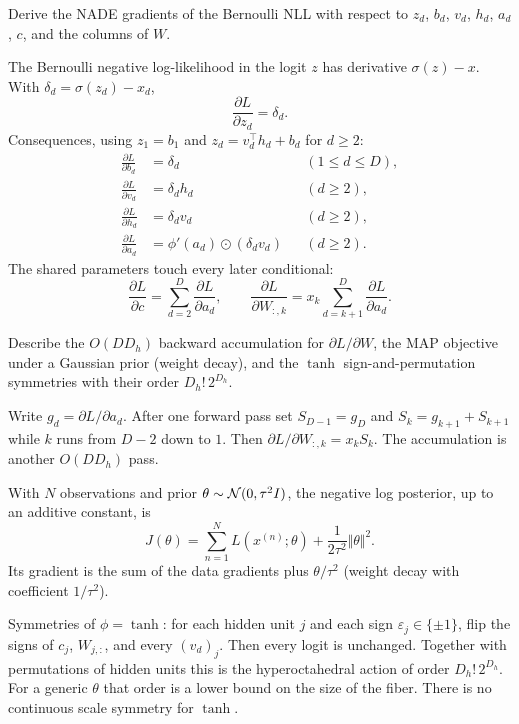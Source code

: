 \begin{hwqbox}
Derive the NADE gradients of the Bernoulli NLL with respect to $z_d$, $b_d$, $v_d$, $h_d$, $a_d$, $c$, and the columns of $W$.
\end{hwqbox}
\begin{hwsolbox}
The Bernoulli negative log-likelihood in the logit $z$ has derivative $\sigma(z)-x$. With $\delta_d=\sigma(z_d)-x_d$,
\[
\frac{\partial L}{\partial z_d}=\delta_d.
\]
Consequences, using $z_1=b_1$ and $z_d=v_d^\top h_d+b_d$ for $d\ge 2$:
\begin{align*}
\frac{\partial L}{\partial b_d}&=\delta_d &&(1\le d\le D),\\
\frac{\partial L}{\partial v_d}&=\delta_d h_d &&(d\ge 2),\\
\frac{\partial L}{\partial h_d}&=\delta_d v_d &&(d\ge 2),\\
\frac{\partial L}{\partial a_d}&=\phi'(a_d)\odot(\delta_d v_d) &&(d\ge 2).
\end{align*}
The shared parameters touch every later conditional:
\[
\frac{\partial L}{\partial c}=\sum_{d=2}^D\frac{\partial L}{\partial a_d},\qquad
\frac{\partial L}{\partial W_{:,k}}=x_k\sum_{d=k+1}^D\frac{\partial L}{\partial a_d}.
\]
\end{hwsolbox}

\begin{hwqbox}
Describe the $O(DD_h)$ backward accumulation for $\partial L/\partial W$, the MAP objective under a Gaussian prior (weight decay), and the $\tanh$ sign-and-permutation symmetries with their order $D_h!\,2^{D_h}$.
\end{hwqbox}
\begin{hwsolbox}
Write $g_d=\partial L/\partial a_d$. After one forward pass set $S_{D-1}=g_D$ and $S_k=g_{k+1}+S_{k+1}$ while $k$ runs from $D-2$ down to $1$. Then $\partial L/\partial W_{:,k}=x_k S_k$. The accumulation is another $O(DD_h)$ pass.

With $N$ observations and prior $\theta\sim\mathcal{N}(0,\tau^2 I)$, the negative log posterior, up to an additive constant, is
\[
J(\theta)=\sum_{n=1}^N L(x^{(n)};\theta)+\frac{1}{2\tau^2}\Vert\theta\Vert^2.
\]
Its gradient is the sum of the data gradients plus $\theta/\tau^2$ (weight decay with coefficient $1/\tau^2$).

Symmetries of $\phi=\tanh$: for each hidden unit $j$ and each sign $\varepsilon_j\in\{\pm 1\}$, flip the signs of $c_j$, $W_{j,:}$, and every $(v_d)_j$. Then every logit is unchanged. Together with permutations of hidden units this is the hyperoctahedral action of order $D_h!\,2^{D_h}$. For a generic $\theta$ that order is a lower bound on the size of the fiber. There is no continuous scale symmetry for $\tanh$.
\end{hwsolbox}

